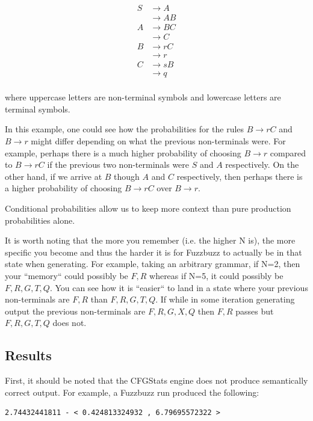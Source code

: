 \begin{align*}
S &\rightarrow A \\
&\rightarrow A B \\
A &\rightarrow B C \\
&\rightarrow C \\
B &\rightarrow r C \\
&\rightarrow r \\
C &\rightarrow s B \\
&\rightarrow q \\
\end{align*}

\noindent
where uppercase letters are non-terminal symbols and lowercase letters are
terminal symbols.


In this example, one could see how the probabilities for the rules $B
\rightarrow rC$ and $B \rightarrow r$ might differ depending on what the
previous non-terminals were. For example, perhaps there is a much higher
probability of choosing $B \rightarrow r$ compared to $B \rightarrow rC$ if the
previous two non-terminals were $S$ and $A$ respectively. On the other hand, if
we arrive at $B$ though $A$ and $C$ respectively, then perhaps there is a
higher probability of choosing $B \rightarrow rC$ over $B \rightarrow r$.

Conditional probabilities allow us to keep more context than pure production
probabilities alone.

It is worth noting that the more you remember (i.e. the higher N is), the more
specific you become and thus the harder it is for Fuzzbuzz to actually be in
that state when generating. For example, taking an arbitrary grammar, if N=2,
then your ``memory`` could possibly be $F, R$ whereas if N=5, it could possibly
be $F, R, G, T, Q$. You can see how it is ``easier`` to land in a state where
your previous non-terminals are $F, R$ than $F, R, G, T, Q$. If while in some
iteration generating output the previous non-terminals are $F, R, G, X, Q$ then
$F, R$ passes but $F, R, G, T, Q$ does not.

\subsection{Results}

First, it should be noted that the CFGStats engine does not produce semantically
correct output. For example, a Fuzzbuzz run produced the following:

\begin{verbatim}
2.74432441811 - < 0.424813324932 , 6.79695572322 >
\end{verbatim}

